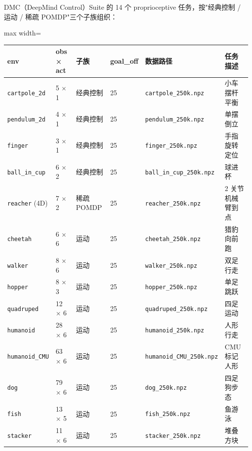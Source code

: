 \documentclass[11pt,a4paper]{article}
\begin{document}
DMC（DeepMind Control）Suite 的 14 个 proprioceptive 任务，按"经典控制 / 运动 / 稀疏 POMDP"三个子族组织：

\begin{table}
\centering
\small
\begin{adjustbox}{max width=\textheight}
\scriptsize
\begin{tabular}{p{}p{}p{}p{}p{}p{}}
\toprule
\textbf{env} & \textbf{obs × act} & \textbf{子族} & \textbf{goal\_off} & \textbf{数据路径} & \textbf{任务描述} \\
\midrule
\texttt{cartpole\_2d}     & 5 × 1   & 经典控制 & 25 & \texttt{cartpole\_250k.npz}  & 小车摆杆平衡 \\
\texttt{pendulum\_2d}     & 4 × 1   & 经典控制 & 25 & \texttt{pendulum\_250k.npz}  & 单摆倒立 \\
\texttt{finger}          & 3 × 1   & 经典控制 & 25 & \texttt{finger\_250k.npz} & 手指旋转定位 \\
\texttt{ball\_in\_cup}    & 6 × 2   & 经典控制 & 25 & \texttt{ball\_in\_cup\_250k.npz} & 球进杯 \\
\texttt{reacher} (4D)    & 7 × 2   & 稀疏 POMDP & 25 & \texttt{reacher\_250k.npz} & 2 关节机械臂到点 \\
\texttt{cheetah}         & 6 × 6   & 运动     & 25 & \texttt{cheetah\_250k.npz}  & 猎豹向前跑 \\
\texttt{walker}          & 8 × 6   & 运动     & 25 & \texttt{walker\_250k.npz}   & 双足行走 \\
\texttt{hopper}          & 8 × 3   & 运动     & 25 & \texttt{hopper\_250k.npz}   & 单足跳跃 \\
\texttt{quadruped}       & 12 × 6  & 运动     & 25 & \texttt{quadruped\_250k.npz} & 四足运动 \\
\texttt{humanoid}        & 28 × 6  & 运动     & 25 & \texttt{humanoid\_250k.npz}  & 人形行走 \\
\texttt{humanoid\_CMU}   & 63 × 6  & 运动     & 25 & \texttt{humanoid\_CMU\_250k.npz} & CMU 标记人形 \\
\texttt{dog}             & 79 × 6  & 运动     & 25 & \texttt{dog\_250k.npz}      & 四足狗步态 \\
\texttt{fish}            & 13 × 5  & 运动     & 25 & \texttt{fish\_250k.npz}     & 鱼游泳 \\
\texttt{stacker}         & 11 × 6  & 运动     & 25 & \texttt{stacker\_250k.npz}  & 堆叠方块 \\
\bottomrule
\end{tabular}
\end{adjustbox}
\end{table}
\end{document}
